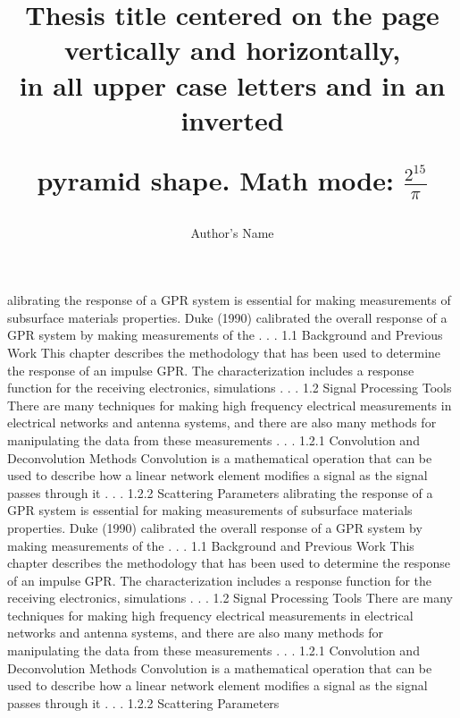 \documentclass[12pt]{mines-thesis}
\title{Thesis title centered on the page vertically and horizontally,\protect\\
%	
	 	in all upper case letters and in an inverted 
	
		pyramid shape. Math mode: $\frac{2^{15}}{\pi}$
 }         %
\author{Author's Name}  %
\begin{document}
	
	
	\makefrontmatter

alibrating the response of a GPR system is essential for making measurements of subsurface materials properties. Duke (1990) calibrated the overall response of a GPR system by making measurements of the . . .
1.1 Background and Previous Work
This chapter describes the methodology that has been used to determine the response of an impulse GPR. The characterization includes a response function for the receiving electronics, simulations . . .
1.2 Signal Processing Tools
There are many techniques for making high frequency electrical measurements in electrical networks and antenna systems, and there are also many methods for manipulating the data from these measurements . . .
1.2.1 Convolution and Deconvolution Methods
Convolution is a mathematical operation that can be used to describe how a linear network element modifies a signal as the signal passes through it . . .
1.2.2 Scattering Parameters
\newpage
alibrating the response of a GPR system is essential for making measurements of subsurface materials properties. Duke (1990) calibrated the overall response of a GPR system by making measurements of the . . .
1.1 Background and Previous Work
This chapter describes the methodology that has been used to determine the response of an impulse GPR. The characterization includes a response function for the receiving electronics, simulations . . .
1.2 Signal Processing Tools
There are many techniques for making high frequency electrical measurements in electrical networks and antenna systems, and there are also many methods for manipulating the data from these measurements . . .
1.2.1 Convolution and Deconvolution Methods
Convolution is a mathematical operation that can be used to describe how a linear network element modifies a signal as the signal passes through it . . .
1.2.2 Scattering Parameters
\end{document}
